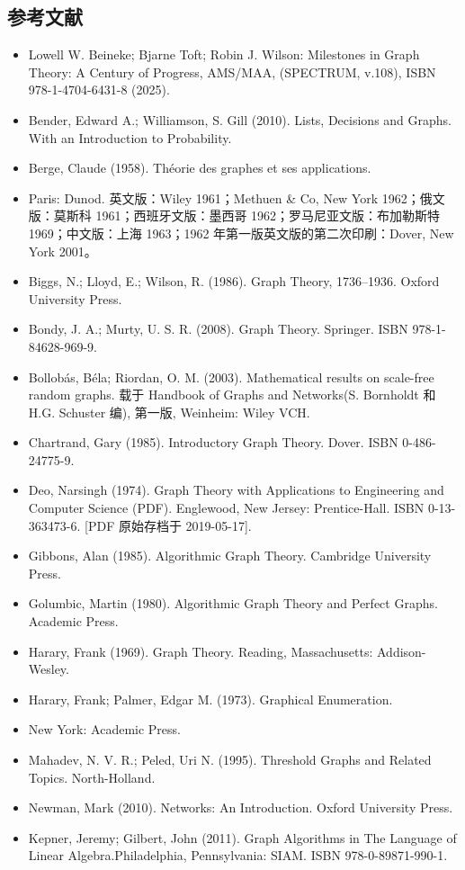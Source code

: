 \subsection{参考文献}
\begin{itemize}
\item Lowell W. Beineke; Bjarne Toft; Robin J. Wilson: Milestones in Graph Theory: A Century of Progress, AMS/MAA, (SPECTRUM, v.108), ISBN 978-1-4704-6431-8 (2025).
\item Bender, Edward A.; Williamson, S. Gill (2010). Lists, Decisions and Graphs. With an Introduction to Probability.
\item Berge, Claude (1958). Théorie des graphes et ses applications.\item Paris: Dunod. 英文版：Wiley 1961；Methuen & Co, New York 1962；俄文版：莫斯科 1961；西班牙文版：墨西哥 1962；罗马尼亚文版：布加勒斯特 1969；中文版：上海 1963；1962 年第一版英文版的第二次印刷：Dover, New York 2001。
\item Biggs, N.; Lloyd, E.; Wilson, R. (1986). Graph Theory, 1736–1936. Oxford University Press.
\item Bondy, J. A.; Murty, U. S. R. (2008). Graph Theory. Springer. ISBN 978-1-84628-969-9.
\item Bollobás, Béla; Riordan, O. M. (2003). Mathematical results on scale-free random graphs. 载于 Handbook of Graphs and Networks(S. Bornholdt 和 H.G. Schuster 编), 第一版, Weinheim: Wiley VCH.
\item Chartrand, Gary (1985). Introductory Graph Theory. Dover. ISBN 0-486-24775-9.
\item Deo, Narsingh (1974). Graph Theory with Applications to Engineering and Computer Science (PDF). Englewood, New Jersey: Prentice-Hall. ISBN 0-13-363473-6. [PDF 原始存档于 2019-05-17].
\item Gibbons, Alan (1985). Algorithmic Graph Theory. Cambridge University Press.
\item Golumbic, Martin (1980). Algorithmic Graph Theory and Perfect Graphs. Academic Press.
\item Harary, Frank (1969). Graph Theory. Reading, Massachusetts: Addison-Wesley.
\item Harary, Frank; Palmer, Edgar M. (1973). Graphical Enumeration.\item New York: Academic Press.
\item Mahadev, N. V. R.; Peled, Uri N. (1995). Threshold Graphs and Related Topics. North-Holland.
\item Newman, Mark (2010). Networks: An Introduction. Oxford University Press.
\item Kepner, Jeremy; Gilbert, John (2011). Graph Algorithms in The Language of Linear Algebra.Philadelphia, Pennsylvania: SIAM. ISBN 978-0-89871-990-1.
\end{itemize}
